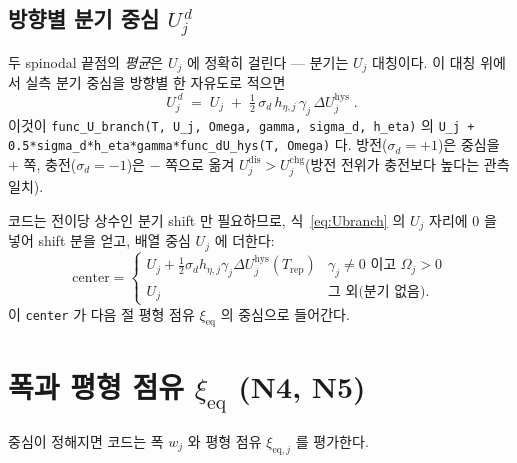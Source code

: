 \documentclass[11pt,a4paper]{article}
\newcommand{\eq}{\mathrm{eq}}
\newcommand{\dis}{\mathrm{dis}}
\newcommand{\chg}{\mathrm{chg}}
\newcommand{\hys}{\mathrm{hys}}
\newcommand{\rep}{\mathrm{rep}}
\newcommand{\code}[1]{\texttt{#1}}
\begin{document}
\subsection{방향별 분기 중심 $U_j^{\,d}$}
두 spinodal 끝점의 \emph{평균}은 $U_j$ 에 정확히 걸린다 — 분기는 $U_j$ 대칭이다. 이 대칭 위에서 실측 분기 중심을
방향별 한 자유도로 적으면
\begin{equation}
\boxed{\;U_j^{\,d}\;=\;U_j\;+\;\tfrac12\,\sigma_d\,h_{\eta,j}\,\gamma_j\,\Delta U_j^\hys\;.}
\label{eq:Ubranch}
\end{equation}
이것이 \code{func\_U\_branch(T, U\_j, Omega, gamma, sigma\_d, h\_eta)} 의
\code{U\_j + 0.5*sigma\_d*h\_eta*gamma*func\_dU\_hys(T, Omega)} 다. 방전($\sigma_d=+1$)은 중심을 $+$ 쪽,
충전($\sigma_d=-1$)은 $-$ 쪽으로 옮겨 $U_j^{\dis}>U_j^{\chg}$(방전 전위가 충전보다 높다는 관측 일치).

코드는 전이당 상수인 분기 shift 만 필요하므로, 식~\eqref{eq:Ubranch} 의 $U_j$ 자리에 $0$ 을 넣어 shift 분을 얻고,
배열 중심 $U_j$ 에 더한다:
\begin{equation}
\mathrm{center}=
\begin{cases}
U_j+\tfrac12\sigma_d h_{\eta,j}\gamma_j\Delta U_j^\hys(T_\rep) & \gamma_j\ne0 \text{ 이고 } \Omega_j>0\\[2pt]
U_j & \text{그 외(분기 없음)}.
\end{cases}
\label{eq:center}
\end{equation}
이 \code{center} 가 다음 절 평형 점유 $\xi_\eq$ 의 중심으로 들어간다.

\section{폭과 평형 점유 $\xi_\eq$ (N4, N5)}\label{sec:width}
중심이 정해지면 코드는 폭 $w_j$ 와 평형 점유 $\xi_{\eq,j}$ 를 평가한다.
\end{document}
